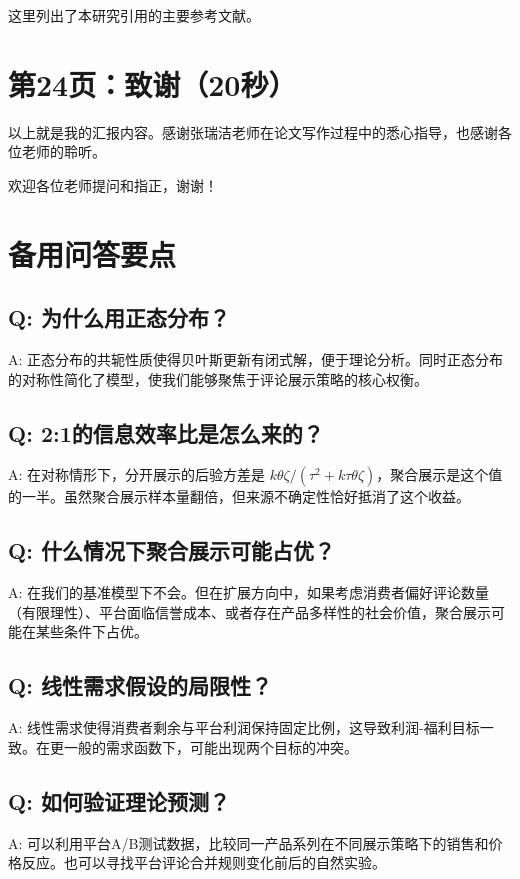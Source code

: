 \documentclass[12pt,a4paper]{article}
\begin{document}
这里列出了本研究引用的主要参考文献。

\section*{第24页：致谢（20秒）}

以上就是我的汇报内容。感谢张瑞洁老师在论文写作过程中的悉心指导，也感谢各位老师的聆听。

欢迎各位老师提问和指正，谢谢！

\newpage
\section*{备用问答要点}

\subsection*{Q: 为什么用正态分布？}
A: 正态分布的共轭性质使得贝叶斯更新有闭式解，便于理论分析。同时正态分布的对称性简化了模型，使我们能够聚焦于评论展示策略的核心权衡。

\subsection*{Q: 2:1的信息效率比是怎么来的？}
A: 在对称情形下，分开展示的后验方差是 $k\theta\zeta / (\tau^2 + k\tau\theta\zeta)$，聚合展示是这个值的一半。虽然聚合展示样本量翻倍，但来源不确定性恰好抵消了这个收益。

\subsection*{Q: 什么情况下聚合展示可能占优？}
A: 在我们的基准模型下不会。但在扩展方向中，如果考虑消费者偏好评论数量（有限理性）、平台面临信誉成本、或者存在产品多样性的社会价值，聚合展示可能在某些条件下占优。

\subsection*{Q: 线性需求假设的局限性？}
A: 线性需求使得消费者剩余与平台利润保持固定比例，这导致利润-福利目标一致。在更一般的需求函数下，可能出现两个目标的冲突。

\subsection*{Q: 如何验证理论预测？}
A: 可以利用平台A/B测试数据，比较同一产品系列在不同展示策略下的销售和价格反应。也可以寻找平台评论合并规则变化前后的自然实验。
\end{document}
